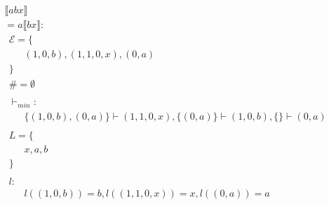 \begin{align*} 
	 &  & \\ 
	 & \llbracket abx \rrbracket & \\ 
	 & = a\llbracket bx \rrbracket:  & \\ 
	 & \ \ \mathcal{{E}}= \{  & \\ 
	 & \qquad (1, 0, b), (1, 1, 0, x), (0, a) \\ 
	 & \ \ \} & \\ 
	 & \ \ \# = \emptyset & \\ 
	 & \ \  & \\ 
	 & \ \ \vdash_{{min}}: & \\ 
	 & \qquad \{ (1, 0, b), (0, a) \} \vdash (1, 1, 0, x), \{ (0, a) \} \vdash (1, 0, b), \{  \} \vdash (0, a) \\ 
	 & \ \  & \\ 
	 & \ \ L=\{ & \\ 
	 & \qquad x, a, b \\ 
	 & \ \ \} & \\ 
	 & \ \  & \\ 
	 & \ \ l: & \\ 
	 & \qquad l((1, 0, b)) = b, l((1, 1, 0, x)) = x, l((0, a)) = a \\ 
	 & \ \  & \\ 
\end{align*} 


